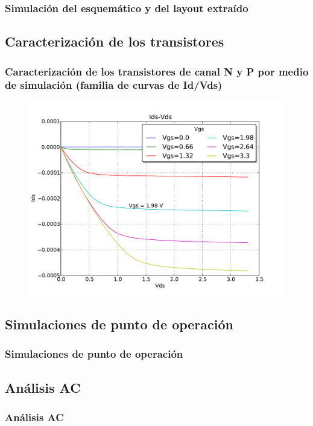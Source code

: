 \documentclass{beamer}
\begin{document}
\begin{frame}
\frametitle{Simulación del esquemático y del layout extraído}
\end{frame}
\subsection{Caracterización de los transistores}
\begin{frame}
  \frametitle{Caracterización de los transistores de canal N y P por medio de simulación (familia de curvas de Id/Vds)}
  \begin{figure}
  \includegraphics[width=0.95\linewidth]{figuras/nmosMin-IDS-VDS.pdf}
  \end{figure}

\end{frame}
\subsection{Simulaciones de punto de operación}
\begin{frame}
\frametitle{Simulaciones de punto de operación}
\end{frame}
\subsection{Análisis AC}
\begin{frame}
\frametitle{Análisis AC}
\end{frame}
\end{document}
